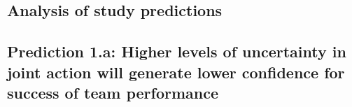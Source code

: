 \begin{CJK}{UTF8}{gbsn}



















\section{Analysis of study predictions\label{sect:resultsStudyPredictions}}


\subsection{Prediction 1.a: Higher levels of uncertainty in joint action will generate lower confidence for success of team performance}



\end{CJK}
